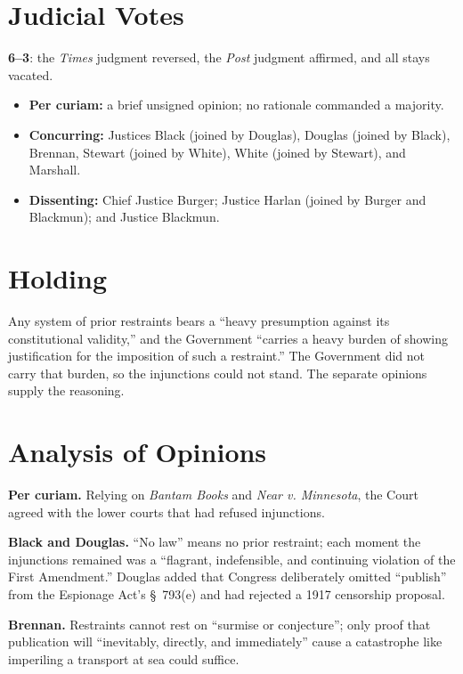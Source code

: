 \documentclass[12pt]{article}
\begin{document}
\section{Judicial Votes}

\textbf{6--3}: the \textit{Times} judgment reversed, the \textit{Post} judgment affirmed, and all stays vacated.
\begin{itemize}
\item \textbf{Per curiam:} a brief unsigned opinion; no rationale commanded a majority.
\item \textbf{Concurring:} Justices Black (joined by Douglas), Douglas (joined by Black), Brennan, Stewart (joined by White), White (joined by Stewart), and Marshall.
\item \textbf{Dissenting:} Chief Justice Burger; Justice Harlan (joined by Burger and Blackmun); and Justice Blackmun.
\end{itemize}

\section{Holding}

Any system of prior restraints bears a ``heavy presumption against its constitutional validity,'' and the Government ``carries a heavy burden of showing justification for the imposition of such a restraint.'' The Government did not carry that burden, so the injunctions could not stand. The separate opinions supply the reasoning.

\section{Analysis of Opinions}

\textbf{Per curiam.} Relying on \textit{Bantam Books} and \textit{Near v. Minnesota}, the Court agreed with the lower courts that had refused injunctions.

\textbf{Black and Douglas.} ``No law'' means no prior restraint; each moment the injunctions remained was a ``flagrant, indefensible, and continuing violation of the First Amendment.'' Douglas added that Congress deliberately omitted ``publish'' from the Espionage Act's \S~793(e) and had rejected a 1917 censorship proposal.

\textbf{Brennan.} Restraints cannot rest on ``surmise or conjecture''; only proof that publication will ``inevitably, directly, and immediately'' cause a catastrophe like imperiling a transport at sea could suffice.
\end{document}

